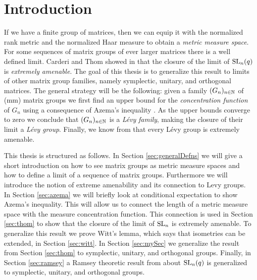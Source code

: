 
\section{Introduction}
If we have a finite group of matrices, then we can equip it with the normalized rank metric and the normalized Haar measure to obtain a \emph{metric measure space}.
For some sequences of matrix groups of ever larger matrices there is a well defined limit.
Carderi and Thom  showed in \cite{thom} that the closure of the limit of $\operatorname{SL}_n(q)$ is \emph{extremely amenable}. The goal of this thesis is to generalize this result to limits of other matrix group families, namely symplectic, unitary, and orthogonal matrices. The general strategy will be the following: given a family $(G_n)_{n\in\mathbb{N}}$ of (mm) matrix groups we first find an upper bound for the \emph{concentration function} of $G_n$ using a consequence of Azema's inequality \cite{Azema}. As the upper bounds converge to zero we conclude that $(G_n)_{n\in\mathbb{N}}$ is a \emph{L\'{e}vy family}, making the closure of their limit a \emph{L\'{e}vy group}. Finally, we know from \cite{Levy} that every L\'{e}vy group is extremely amenable.

This thesis is structured as follows. In Section \ref{sec:generalDefns} we will give a short introduction on how to see matrix groups as metric measure spaces and how to define a limit of a sequence of matrix groups. Furthermore we will introduce the notion of extreme amenability and its connection to Levy groups. In Section \ref{sec:azema} we will briefly look at conditional expectation to show Azema's inequality. This will allow us to connect the length of a metric measure space with the measure concentration function. This connection is used in Section \ref{sec:thom} to show that the closure of the limit of $\operatorname{SL}_n$ is extremely amenable. To generalize this result we prove Witt's lemma, which says that isometries can be extended, in Section \ref{sec:witt}. In Section \ref{sec:mySec} we generalize the result from Section \ref{sec:thom} to symplectic, unitary, and orthogonal groups. Finally, in Section \ref{sec:ramsey} a Ramsey theoretic result from \cite{thom} about $\operatorname{SL}_n(q)$ is generalized to symplectic, unitary, and orthogonal groups.



